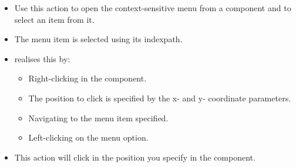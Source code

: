 
\begin{itemize}
\item Use this action to open the context-sensitive menu from a component and to select an item from it.
\item The menu item is selected using its indexpath. 
\item \gd{} realises this by:
\begin{itemize}
\item Right-clicking in the component.
\item The position to click is specified by the x- and y- coordinate parameters.
\item Navigating to the menu item specified.
\item Left-clicking on the menu option.  
\end{itemize}
\item This action will click in the position you specify in the component.

\end{itemize}


